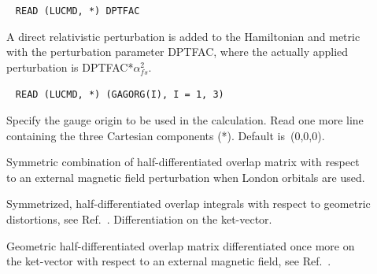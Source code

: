 \begin{description}
\item[]\verb| |\newline
\verb|READ (LUCMD, *) DPTFAC|

A direct relativistic perturbation is added to the
  Hamiltonian and metric with the perturbation parameter DPTFAC, where
  the actually applied perturbation is DPTFAC*$\alpha_{fs}^2$.

\item[]\verb| |\newline
\verb|READ (LUCMD, *) (GAGORG(I), I = 1, 3)|

Specify the gauge origin to be used in the
calculation. Read one more line containing the three Cartesian
components (*). Default is~(0,0,0).

\item[] Symmetric combination of half-differentiated
  overlap matrix with respect to an external magnetic field
  perturbation when London orbitals are used.


\item[] Symmetrized, half-differentiated
overlap integrals with respect to geometric
distortions, see
Ref.~\cite{klbpjhjajjothjcp97}. Differentiation on the ket-vector.


\item[] Geometric half-differentiated overlap
matrix
differentiated once more on the ket-vector with respect to an external
magnetic field, see Ref.~\cite{klbpjthkrhjajjcp98}.


\end{description}
